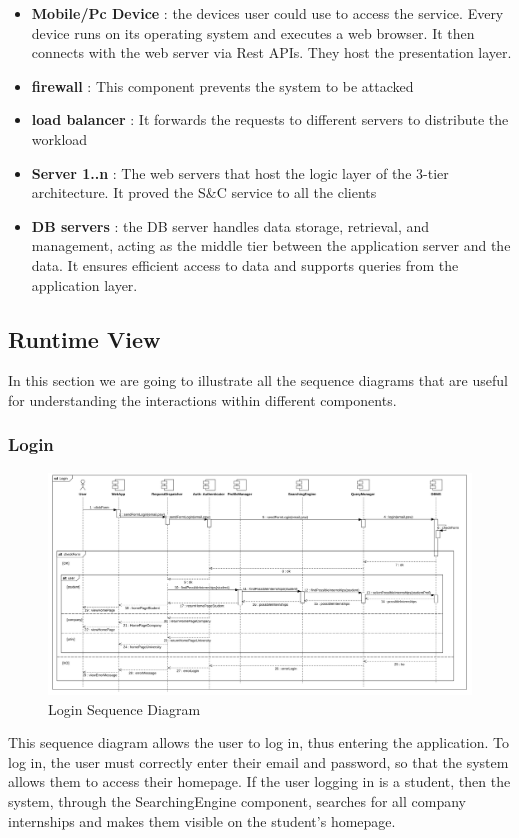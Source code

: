 \documentclass{article}
\begin{document}
\begin{itemize}
    \item \textbf{Mobile/Pc Device} : the devices user could use to access the service. Every device runs on its operating system and executes a web browser. It then connects with the web server via Rest APIs. They host the presentation layer.  
    \item \textbf{firewall} : This component prevents the system to be attacked 
    \item \textbf{load balancer} : It forwards the requests to different servers to distribute the workload 
    \item \textbf{Server 1..n} : The web servers that host the logic layer of the 3-tier architecture. It proved the S\&C service to all the clients
    \item \textbf{DB servers} : the DB server handles data storage, retrieval, and management, acting as the middle tier between the application server and the data. It ensures efficient access to data and supports queries from the application layer.
\end{itemize}

\subsection{Runtime View}
In this section we are going to illustrate all the sequence diagrams that are useful for understanding the interactions within different components.

\subsubsection{Login}
\begin{figure}[H]
    \centering
    \includegraphics[width=1\linewidth]{SequenceDiagram/LoginSD.png}
    \caption{Login Sequence Diagram}
    \label{fig:enter-label}
\end{figure}
This sequence diagram allows the user to log in, thus entering the application. To log in, the user must correctly enter their email and password, so that the system allows them to access their homepage. If the user logging in is a student, then the system, through the SearchingEngine component, searches for all company internships and makes them visible on the student's homepage. 
\end{document}
